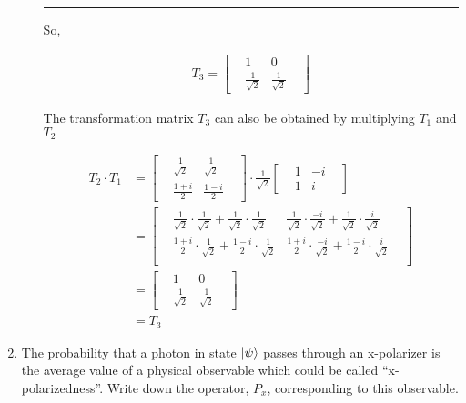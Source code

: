 \documentclass[12pt, oneside]{article}
\newenvironment{answer}
  {\vspace*{0.2cm} \rule{12cm}{0.02cm} \vspace*{0.2cm}}
  {\vspace*{0.2cm}}
\begin{document}
\begin{enumerate}
\begin{enumerate}
\begin{answer}
      So,

      \begin{align*}
        T_3 = \begin{bmatrix}
                &1 &0 &\\
                &\frac{1}{\sqrt{2}} &\frac{1}{\sqrt{2}} &
              \end{bmatrix}
      \end{align*}

      The transformation matrix $T_3$ can also be obtained by multiplying $T_1$ and $T_2$

      \begin{align*}
        T_2 \cdot T_1 &= \begin{bmatrix} &\frac{1}{\sqrt{2}} &\frac{1}{\sqrt{2}} &\\ &\frac{1+i}{2} &\frac{1-i}{2} & \end{bmatrix} \cdot \frac{1}{\sqrt{2}}\begin{bmatrix} &1 &-i &\\ &1 &i &\end{bmatrix} \\
        &= \begin{bmatrix}
              &\frac{1}{\sqrt{2}}\cdot\frac{1}{\sqrt{2}}+ \frac{1}{\sqrt{2}}\cdot\frac{1}{\sqrt{2}} & \frac{1}{\sqrt{2}}\cdot\frac{-i}{\sqrt{2}}+ \frac{1}{\sqrt{2}}\cdot\frac{i}{\sqrt{2}} &\\
              &\frac{1+i}{2}\cdot\frac{1}{\sqrt{2}}+ \frac{1-i}{2}\cdot\frac{1}{\sqrt{2}} & \frac{1+i}{2}\cdot\frac{-i}{\sqrt{2}}+ \frac{1-i}{2}\cdot\frac{i}{\sqrt{2}} &\\
           \end{bmatrix}\\
        &= \begin{bmatrix}
            & 1 &0 &\\
            &\frac{1}{\sqrt{2}} &\frac{1}{\sqrt{2}} &
           \end{bmatrix}\\
        &= T_3
      \end{align*}
    \end{answer}

  \end{enumerate}

  \item The probability that a photon in state $\ket{\psi}$ passes through an x-polarizer is the average value of a physical observable which could be called ``x-polarizedness”. Write down the operator, $P_x$, corresponding to this observable.


\end{enumerate}
\end{document}
